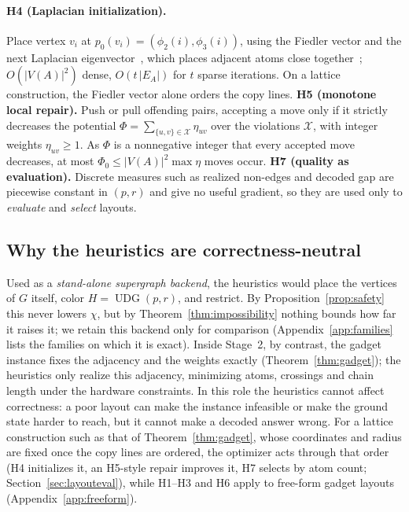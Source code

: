 \documentclass[a4paper,fleqn]{cas-sc}
\newcommand{\UDG}{\operatorname{UDG}}
\begin{document}
\paragraph{H4 (Laplacian initialization).} Place vertex $v_i$ at
$p_0(v_i)=(\phi_2(i),\phi_3(i))$, using the Fiedler vector and the next Laplacian
eigenvector~\cite{Fiedler1973,Chung1997,Belkin2001}, which places adjacent atoms
close together~\cite{Fruchterman1991}; $O(|V(A)|^2)$ dense, $O(t\,|E_A|)$ for $t$
sparse iterations. On a lattice construction, the Fiedler vector alone orders the
copy lines.
\textbf{H5 (monotone local repair).} Push or pull offending pairs, accepting a move
only if it strictly decreases the potential
$\Phi=\sum_{\{u,v\}\in\mathcal X}\eta_{uv}$ over the violations $\mathcal X$, with
integer weights $\eta_{uv}\ge1$. As $\Phi$ is a nonnegative integer that every
accepted move decreases, at most $\Phi_0\le|V(A)|^2\max\eta$ moves occur.
\textbf{H7 (quality as evaluation).} Discrete measures such as realized non-edges and
decoded gap are piecewise constant in $(p,r)$ and give no useful gradient, so they are
used only to \emph{evaluate} and \emph{select} layouts.

\subsection{Why the heuristics are correctness-neutral}
\label{sec:role}

Used as a \emph{stand-alone supergraph backend}, the heuristics would place the
vertices of $G$ itself, color $H=\UDG(p,r)$, and restrict. By
Proposition~\ref{prop:safety} this never lowers $\chi$, but by
Theorem~\ref{thm:impossibility} nothing bounds how far it raises it; we retain this
backend only for comparison (Appendix~\ref{app:families} lists the families on which
it is exact). Inside Stage~2, by contrast, the gadget instance fixes the adjacency and
the weights exactly (Theorem~\ref{thm:gadget}); the heuristics only realize this
adjacency, minimizing atoms, crossings and chain length under the hardware
constraints. In this role the heuristics cannot affect correctness: a poor layout can
make the instance infeasible or make the ground state harder to reach, but it cannot
make a decoded answer wrong. For a lattice construction such as that of
Theorem~\ref{thm:gadget}, whose coordinates and radius are fixed once the copy lines
are ordered, the optimizer acts through that order (H4 initializes it, an H5-style
repair improves it, H7 selects by atom count; Section~\ref{sec:layouteval}), while
H1--H3 and H6 apply to free-form gadget layouts (Appendix~\ref{app:freeform}).
\end{document}
